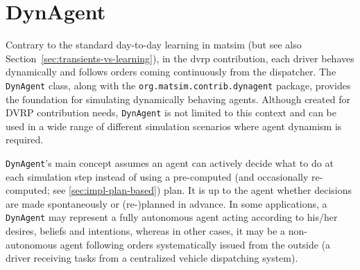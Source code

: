 \section{DynAgent}
\label{sec:dynAgent}
Contrary to the standard day-to-day learning in \gls{matsim} (but see also Section~\ref{sec:transients-vs-learning}), in the \gls{dvrp} contribution, each driver behaves dynamically and follows orders coming continuously from the dispatcher. The \lstinline$DynAgent$ class, along with the \lstinline$org.matsim.contrib.dynagent$ package, provides the foundation for simulating dynamically behaving agents. Although created for DVRP contribution needs, \lstinline$DynAgent$ is not limited to this context and can be used in a wide range of different simulation scenarios where agent dynamism is required.

\lstinline$DynAgent$'s main concept assumes an agent can actively decide what to do at each simulation step instead of using a pre-computed (and occasionally re-computed; see \ref{sec:impl-plan-based}) plan. It is up to the agent whether decisions are made spontaneously or (re-)planned in advance. In some applications, a \lstinline$DynAgent$ may represent a fully autonomous agent acting according to his/her desires, beliefs and intentions, whereas in other cases, it may be a non-autonomous agent following orders systematically issued from the outside (\eg a driver receiving tasks from a centralized vehicle dispatching system).


